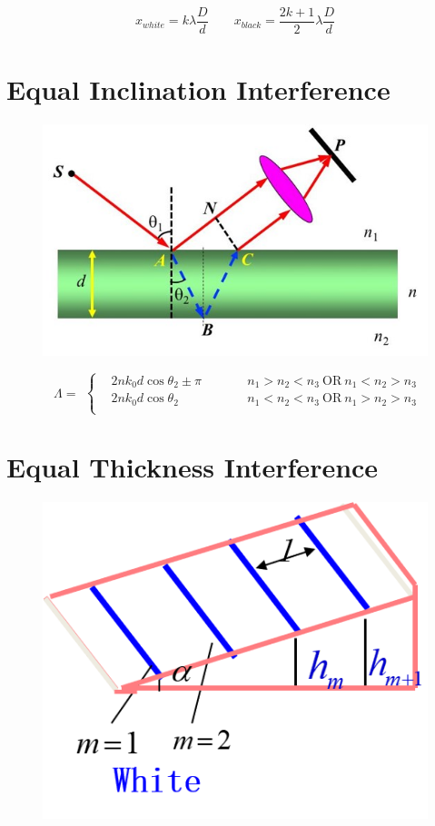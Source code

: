\begin{equation*}
  \begin{aligned}
    x_{white} = k \lambda \dfrac{D}{d} \quad\quad x_{black} = \dfrac{2 k + 1}{2} \lambda \dfrac{D}{d}   
  \end{aligned}
\end{equation*}

\section{Equal Inclination Interference}

\begin{figure}[H]
  \centering
  \includegraphics[width=0.4\linewidth]{figures/Equal-inclination}
\end{figure}

\begin{equation*}
  \begin{aligned}
    \Lambda =
  \end{aligned}
  \left\{
    \begin{aligned}
      & 2nk_0 d \cos \theta_2 \pm \pi && \quad\quad n_1 > n_2 < n_3 \ \text{OR} \  n_1 < n_2 > n_3 \\
      & 2nk_0 d \cos \theta_2 && \quad\quad n_1 < n_2 < n_3 \  \text{OR} \  n_1 > n_2 > n_3 \\
    \end{aligned}
  \right.
\end{equation*}

\section{Equal Thickness Interference}

\begin{figure}[H]
  \centering
  \includegraphics[width=0.4\linewidth]{figures/Equal-thickness}
\end{figure}

